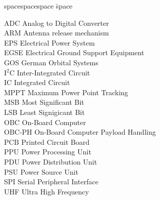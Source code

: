 
\begin{tabbing}
spacespacespace \= space \kill

ADC  \> Analog to Digital Converter\\
ARM \>  Antenna release mechanism\\
EPS \>      Electrical Power System\\
EGSE \> Electrical Ground Support Equipment\\
GOS \> German Orbital Systems\\
I$^2$C \>   Inter-Integrated Circuit\\
IC \>  Integrated Circuit\\
MPPT \>    Maximum Power Point Tracking\\
MSB \>      Most Significant Bit\\
LSB \>      Least Signigicant Bit\\
OBC \> On-Board Computer\\
OBC-PH \> On-Board Computer Payload Handling\\
PCB \> Printed Circuit Board\\
PPU \> Power Processing Unit\\
PDU \> Power Distribution Unit\\
PSU \> Power Source Unit\\
SPI \> Serial Peripheral Interface\\ 

UHF \> Ultra High Frequency\\


\end{tabbing}
\endinput
